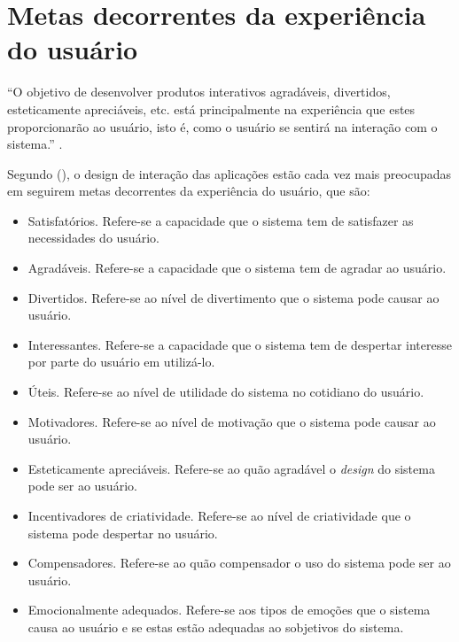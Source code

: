   \section{Metas decorrentes da experiência do usuário}
    
    “O objetivo de desenvolver produtos interativos agradáveis, divertidos, esteticamente apreciáveis, etc. 
    está principalmente na experiência que estes proporcionarão ao usuário, isto é, como o usuário se 
    sentirá na interação com o sistema.” \cite{preece}.
    
    Segundo \citeauthor{preece} (\citeyear{preece}), o design de interação das aplicações estão cada vez mais preocupadas em seguirem 
    metas decorrentes da experiência do usuário, que são:
    
    \begin{itemize}
       \item Satisfatórios.
       \subitem Refere-se a capacidade que o sistema tem de satisfazer as necessidades do usuário.

       \item Agradáveis.
       \subitem Refere-se a capacidade que o sistema tem de agradar ao usuário.

       \item Divertidos.
       \subitem Refere-se ao nível de divertimento que o sistema pode causar ao usuário.

       \item Interessantes.
       \subitem Refere-se a capacidade que o sistema tem de despertar interesse por parte do usuário em utilizá-lo.

       \item Úteis.
       \subitem Refere-se ao nível de utilidade do sistema no cotidiano do usuário.

       \item Motivadores.
       \subitem Refere-se ao nível de motivação que o sistema pode causar ao usuário.

       \item Esteticamente apreciáveis.
       \subitem Refere-se ao quão agradável o \textit{design} do sistema pode ser ao usuário.

       \item Incentivadores de criatividade.
       \subitem Refere-se ao nível de criatividade que o sistema pode despertar no usuário.

       \item Compensadores.
       \subitem Refere-se ao quão compensador o uso do sistema pode ser ao usuário.

       \item Emocionalmente adequados.
       \subitem Refere-se aos tipos de emoções que o sistema causa ao usuário e se estas estão adequadas ao sobjetivos do sistema.
    \end{itemize}
    
